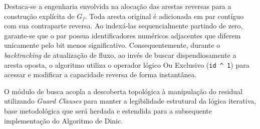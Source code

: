 \documentclass[12pt,a4paper]{article}
\begin{document}
Destaca-se a engenharia envolvida na alocação das arestas reversas para a construção explícita de $G_f$. Toda aresta original é adicionada em par contíguo com sua contraparte reversa. Ao indexá-las sequencialmente partindo de zero, garante-se que o par possua identificadores numéricos adjacentes que diferem unicamente pelo bit menos significativo. Consequentemente, durante o \textit{backtracking} de atualização de fluxo, ao invés de buscar dispendiosamente a aresta oposta, o algoritmo utiliza o operador lógico Ou Exclusivo (\lstinline{id ^ 1}) para acessar e modificar a capacidade reversa de forma instantânea. 

O módulo de busca acopla a descoberta topológica à manipulação do residual utilizando \textit{Guard Clauses} para manter a legibilidade estrutural da lógica iterativa, base metodológica que será herdada e estendida para a subsequente implementação do Algoritmo de Dinic.
\end{document}
